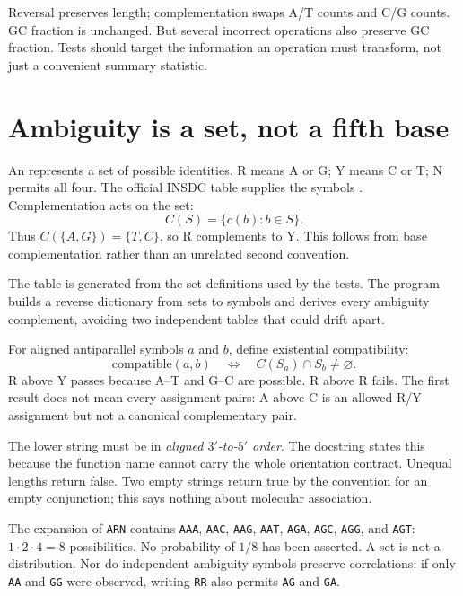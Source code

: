 Reversal preserves length; complementation swaps A/T counts and C/G counts.
GC fraction is unchanged. But several incorrect operations also preserve
GC fraction. Tests should target the information an operation must transform,
not just a convenient summary statistic.

\section{Ambiguity is a set, not a fifth base}
\label{sec:ambiguity}

An  represents a set of possible identities.
R means A or G; Y means C or T; N permits all four. The official INSDC
table supplies the symbols \cite{insdc}. Complementation acts on the set:
\begin{equation}
C(S)=\{c(b):b\in S\}.
\end{equation}
Thus $C(\{A,G\})=\{T,C\}$, so R complements to Y. This follows from base
complementation rather than an unrelated second convention.

\begin{center}\end{center}

The table is generated from the set definitions used by the tests. The
program builds a reverse dictionary from sets to symbols and derives every
ambiguity complement, avoiding two independent tables that could drift apart.

For aligned antiparallel symbols $a$ and $b$, define existential compatibility:
\begin{equation}
\mathrm{compatible}(a,b)
\quad\Longleftrightarrow\quad C(S_a)\cap S_b\ne\varnothing.
\label{eq:compat}
\end{equation}
R above Y passes because A--T and G--C are possible. R above R fails.
The first result does not mean every assignment pairs: A above C is an
allowed R/Y assignment but not a canonical complementary pair.


The lower string must be in \emph{aligned $3'$-to-$5'$ order}.
The docstring states this because the function name cannot carry the whole
orientation contract. Unequal lengths return false. Two empty strings return
true by the convention for an empty conjunction; this says nothing about
molecular association.

The expansion of \texttt{ARN} contains \texttt{AAA}, \texttt{AAC},
\texttt{AAG}, \texttt{AAT}, \texttt{AGA}, \texttt{AGC}, \texttt{AGG}, and
\texttt{AGT}: $1\cdot2\cdot4=8$ possibilities. No probability of $1/8$ has
been asserted. A set is not a distribution. Nor do independent ambiguity
symbols preserve correlations: if only \texttt{AA} and \texttt{GG} were
observed, writing \texttt{RR} also permits \texttt{AG} and \texttt{GA}.

